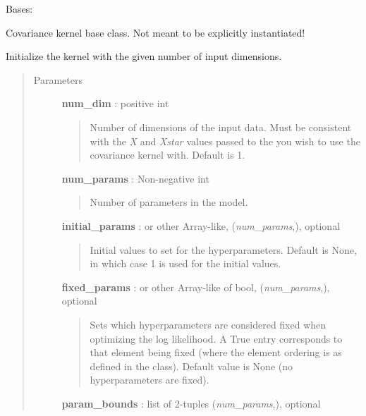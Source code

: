 \documentclass[letterpaper,10pt,english]{sphinxmanual}
\begin{document}
\begin{fulllineitems}
\label{gptools.kernel:gptools.kernel.core.Kernel}
Bases: 

Covariance kernel base class. Not meant to be explicitly instantiated!

Initialize the kernel with the given number of input dimensions.
\begin{quote}\begin{description}
\item[{Parameters}] \leavevmode
\textbf{num\_dim} : positive int
\begin{quote}

Number of dimensions of the input data. Must be consistent with the \emph{X}
and \emph{Xstar} values passed to the {\hyperref[gptools:gptools.gaussian_process.GaussianProcess]{}}
you wish to use the covariance kernel with. Default is 1.
\end{quote}

\textbf{num\_params} : Non-negative int
\begin{quote}

Number of parameters in the model.
\end{quote}

\textbf{initial\_params} :  or other Array-like, (\emph{num\_params},), optional
\begin{quote}

Initial values to set for the hyperparameters. Default is None, in
which case 1 is used for the initial values.
\end{quote}

\textbf{fixed\_params} :  or other Array-like of bool, (\emph{num\_params},), optional
\begin{quote}

Sets which hyperparameters are considered fixed when optimizing the log
likelihood. A True entry corresponds to that element being
fixed (where the element ordering is as defined in the class).
Default value is None (no hyperparameters are fixed).
\end{quote}

\textbf{param\_bounds} : list of 2-tuples (\emph{num\_params},), optional
\begin{quote}


\end{quote}
\end{description}
\end{quote}
\end{fulllineitems}
\end{document}
